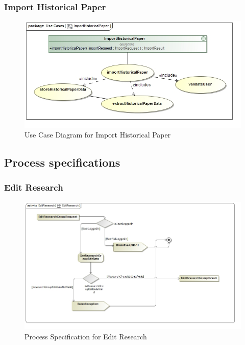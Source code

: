 \documentclass[a4paper,10pt]{article}
\begin{document}
\subsubsection{Import Historical Paper}
	\begin{figure}[h]
		\includegraphics[scale=0.5]{UseImportHistoricalPaper}
		\caption{Use Case Diagram for Import Historical Paper}
	\end{figure}

\subsection{Process specifications}
\subsubsection{Edit Research}
	\begin{figure}[h]
	\includegraphics[scale=0.5]{ActEditResearch}
	\caption{Process Specification for Edit Research}
	\end{figure}
	
\end{document}
